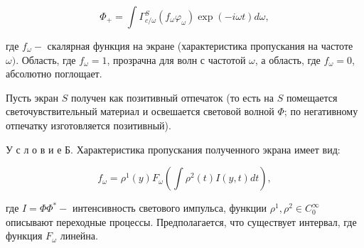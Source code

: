 \documentclass[10pt]{article}
\begin{document}
\[

\Phi_{+}=\int \Gamma_{c / \omega}^{S}\left(f_{\omega} \varphi_{\omega}\right) \exp (-i \omega t) d \omega,

\]



где $f_{\omega}-$ скалярная функция на экране (характеристика пропускания на частоте $\omega)$. Область, где $f_{\omega}=1$, прозрачна для волн с частотой $\omega$, а область, где $f_{\omega}=0$, абсолютно поглощает.



Пусть экран $S$ получен как позитивный отпечаток (то есть на $S$ помещается светочувствительный материал и освешается световой волной $\Phi$; по негативному отпечатку изготовляется позитивный).



У с л о в и е Б. Характеристика пропускания полученного экрана имеет вид:



\[

f_{\omega}=\rho^{1}(y) F_{\omega}\left(\int \rho^{2}(t) I(y, t) d t\right),

\]



где $I=\Phi \Phi^{*}-$ интенсивность светового импульса, функции $\rho^{1}, \rho^{2} \in C_{0}^{\infty}$ описывают переходные процессы. Предполагается, что существует интервал, где функция $F_{\omega}$ линейна.
\end{document}
